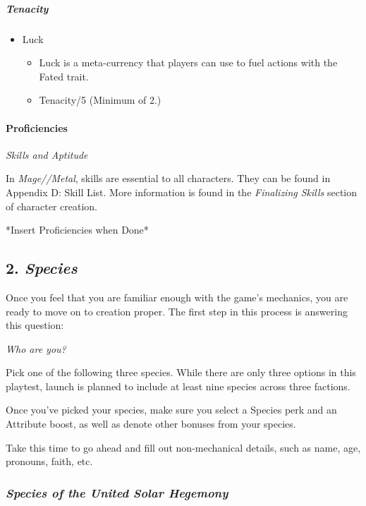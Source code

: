 \documentclass[
]{article}
\providecommand{\tightlist}{%
  \setlength{\itemsep}{0pt}\setlength{\parskip}{0pt}}
\begin{document}
\hypertarget{tenacity-1}{%
\subparagraph{Tenacity}\label{tenacity-1}}

\begin{itemize}
\tightlist
\item
  Luck

  \begin{itemize}
  \tightlist
  \item
    Luck is a meta-currency that players can use to fuel actions with
    the Fated trait.
  \item
    Tenacity/5 (Minimum of 2.)
  \end{itemize}
\end{itemize}

\hypertarget{proficiencies}{%
\paragraph{Proficiencies}\label{proficiencies}}

\emph{Skills and Aptitude}

In {{\emph{Mage//Metal}}}, skills are essential to all characters. They
can be found in Appendix D: Skill List. More information is found in the
\emph{Finalizing Skills} section of character creation.

{*Insert Proficiencies when Done*}

\hypertarget{species}{%
\subsection{\texorpdfstring{2.
\emph{Species}}{2. Species}}\label{species}}

Once you feel that you are familiar enough with the game's mechanics,
you are ready to move on to creation proper. The first step in this
process is answering this question:

\emph{Who are you?}

Pick one of the following three species. While there are only three
options in this playtest, launch is planned to include at least nine
species across three factions.

Once you've picked your species, make sure you select a Species perk and
an Attribute boost, as well as denote other bonuses from your species.

Take this time to go ahead and fill out non-mechanical details, such as
name, age, pronouns, faith, etc.

\hypertarget{species-of-the-united-solar-hegemony}{%
\subsubsection{\texorpdfstring{\textbf{\emph{Species of the United Solar
Hegemony}}}{Species of the United Solar Hegemony}}\label{species-of-the-united-solar-hegemony}}
\end{document}
